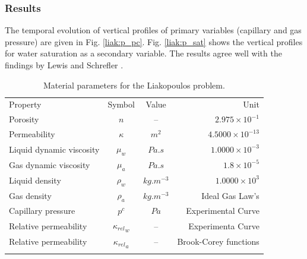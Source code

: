 \subsubsection*{Results}
The temporal evolution of vertical profiles of primary variables (capillary and gas pressure) are given in Fig. \ref{liak:p_pc}. Fig. \ref{liak:p_sat} shows the vertical profiles for water saturation as a secondary variable. The results agree well with the findings by Lewis and Schrefler \cite{LewSch:98}.

\begin{table}[!htb]
\begin{tabular}{lccr}
\hline\noalign{\smallskip}
Property & Symbol & Value & Unit \\
\noalign{\smallskip}\hline\noalign{\smallskip}
Porosity & $n$ & -- & $2.975\times10^{-1}$ \\
Permeability & $\kappa$ & $ m^2$ & $4.5000\times 10^{-13}$ \\
Liquid dynamic viscosity &  $\mu_w$ & $Pa.s$ & $1.0000\times10^{-3}$ \\
Gas dynamic viscosity & $\mu_a$ & $Pa.s$ & $1.8\times10^{-5}$ \\
Liquid density &  $\rho_w$ &$kg.m^{-3}$ & $1.0000\times10^{3}$ \\
Gas density &  $\rho_a$ & $kg.m^{-3}$ & Ideal Gas Law's \\
Capillary pressure & $p^c$ & $Pa$ & Experimental Curve \\
Relative permeability & ${\kappa_{rel}}_{w}$ & -- & Experimenta Curve\\
Relative permeability & ${\kappa_{rel}}_{a}$ & -- & Brook-Corey functions \\
\noalign{\smallskip}\hline
\end{tabular}
\caption{Material parameters for the Liakopoulos problem.}
\end{table}

